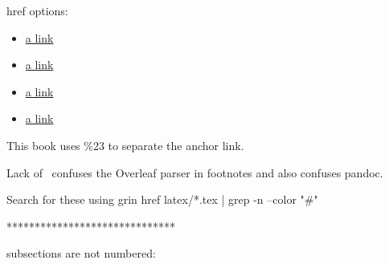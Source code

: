 
href options:
\begin{itemize}
    \item \href{https://en.wikipedia.org/wiki/Business_process%23Adam_Smith}{a link}
    \item \href{https://en.wikipedia.org/wiki/Business_process\%23Adam_Smith}{a link}
    \item \href{https://en.wikipedia.org/wiki/Business_process#Adam_Smith}{a link}
    \item \href{https://en.wikipedia.org/wiki/Business_process\#Adam_Smith}{a link}
\end{itemize}
This book uses \%23 to separate the anchor link. 

Lack of \ confuses the Overleaf parser in footnotes and also confuses pandoc.

Search for these using
grin href latex/*.tex | grep -n --color "#"

******************************

subsections are not numbered: \subsection*{}